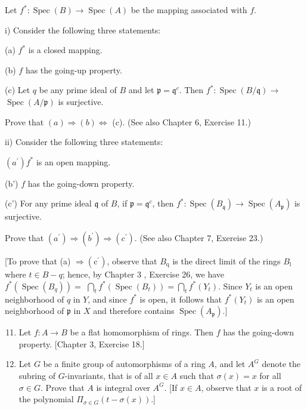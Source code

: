 \documentclass{standalone}
\theoremstyle{definition}
\theoremstyle{remark}
\begin{document}
Let $f^{*}: \operatorname{Spec}(B) \rightarrow \operatorname{Spec}(A)$ be the mapping associated with $f$.

i) Consider the following three statements:

(a) $f^{*}$ is a closed mapping.

(b) $f$ has the going-up property.

(c) Let $q$ be any prime ideal of $B$ and let $\mathfrak{p}=\mathfrak{q}^{c}$. Then $f^{*}: \operatorname{Spec}(B / \mathfrak{q}) \rightarrow$ $\operatorname{Spec}(A / \mathfrak{p})$ is surjective.

Prove that $(a) \Rightarrow(b) \Leftrightarrow$ (c). (See also Chapter 6, Exercise 11.)

ii) Consider the following three statements:

$\left(a^{\prime}\right) f^{*}$ is an open mapping.

(b') $f$ has the going-down property.

(c') For any prime ideal $\mathfrak{q}$ of $B$, if $\mathfrak{p}=\mathfrak{q}^{c}$, then $f^{*}: \operatorname{Spec}\left(B_{\mathfrak{q}}\right) \rightarrow \operatorname{Spec}\left(A_{\mathfrak{p}}\right)$ is surjective.

Prove that $\left(a^{\prime}\right) \Rightarrow\left(b^{\prime}\right) \Rightarrow\left(c^{\prime}\right)$. (See also Chapter 7, Exereise 23.)

[To prove that (a) $\Rightarrow\left(\mathrm{c}^{\prime}\right)$, observe that $B_{\mathrm{q}}$ is the direct limit of the rings $B_{\mathrm{l}}$ where $t \in B-q$; hence, by Chapter 3 , Exercise 26, we have $f^{*}\left(\operatorname{Spec}\left(B_{q}\right)\right)=$ $\bigcap_{t} f^{*}\left(\operatorname{Spec}\left(B_{t}\right)\right)=\bigcap_{t} f^{*}\left(Y_{t}\right)$. Since $Y_{t}$ is an open neighborhood of $q$ in $Y$, and since $f^{*}$ is open, it follows that $f^{*}\left(Y_{t}\right)$ is an open neighborhood of $\mathfrak{p}$ in $X$ and therefore contains $\operatorname{Spec}\left(A_{\mathfrak{p}}\right)$.]

\begin{enumerate}
  \setcounter{enumi}{10}
  \item Let $f: A \rightarrow B$ be a flat homomorphism of rings. Then $f$ has the going-down property. [Chapter 3, Exercise 18.]

  \item Let $G$ be a finite group of automorphisms of a ring $A$, and let $A^{G}$ denote the subring of $G$-invariants, that is of all $x \in A$ such that $\sigma(x)=x$ for all $\sigma \in G$. Prove that $A$ is integral over $A^{G}$. [If $x \in A$, observe that $x$ is a root of the polynomial $\Pi_{\sigma \in G}(t-\sigma(x))$.]

\end{enumerate}
\end{document}
